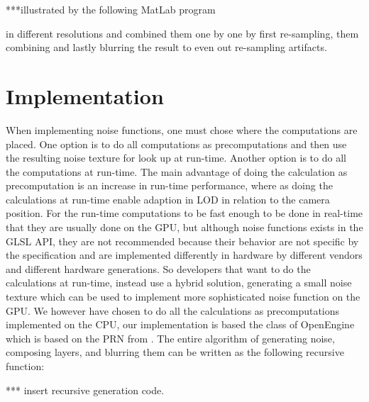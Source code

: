 ***illustrated by the following MatLab program

in different resolutions and combined them one by one by first
re-sampling, them combining and lastly blurring the result to even out
re-sampling artifacts.


\section{Implementation}
When implementing noise functions, one must chose where the
computations are placed. One option is to do all computations as
precomputations and then use the resulting noise texture for look up
at run-time. Another option is to do all the computations at
run-time. The main advantage of doing the calculation as precomputation
is an increase in run-time performance, where as doing the calculations
at run-time enable adaption in LOD in relation to the camera
position. For the run-time computations to be fast enough to be done
in real-time that they are usually done on the GPU, but although noise
functions exists in the GLSL API, they are not recommended because
their behavior are not specific by the specification and are
implemented differently in hardware by different vendors and different
hardware generations. So developers that want to do the calculations
at run-time, instead use a hybrid solution, generating a small noise
texture which can be used to implement more sophisticated noise
function on the GPU.
%
We however have chosen to do all the calculations as precomputations
implemented on the CPU, our implementation is based the
 class of OpenEngine which is based on the PRN from
.
%
The entire algorithm of generating noise, composing layers, and
blurring them can be written as the following recursive function:

*** insert recursive generation code.

